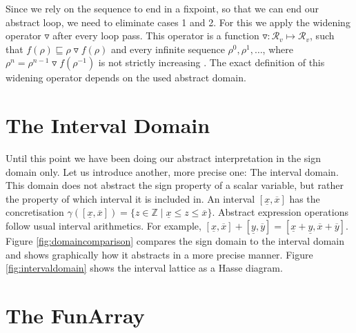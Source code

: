 \begin{enumerate}
\begin{center}
\end{center}
\end{enumerate} 

\noindent Since we rely on the sequence to end in a fixpoint, so that we can end our abstract loop, we need to eliminate cases 1 and 2. For this we apply the widening operator $\triangledown$ after every loop pass. This operator is a function $\triangledown: \mathcal{R}_v\mapsto \mathcal{R}_v$, such that $f(\rho)\sqsubseteq\rho\triangledown f(\rho)$ and every infinite sequence $\rho^0,\rho^1,\dots$, where $\rho^n=\rho^{n-1}\triangledown f(\rho^{-1})$ is not strictly increasing \cite{cousot1977}. The exact definition of this widening operator depends on the used abstract domain.

\section{The Interval Domain}





Until this point we have been doing our abstract interpretation in the sign domain only. Let us introduce another, more precise one: The interval domain. This domain does not abstract the sign property of a scalar variable, but rather the property of which interval it is included in. An interval $[\underline{x},\overline{x}]$ has the concretisation $\gamma([\underline{x},\overline{x}])=\{z\in\mathbb{Z} \;|\; \underline{x}\leq z \leq \overline{x}\}$. Abstract expression operations follow usual interval arithmetics. For example, $[\underline{x},\overline{x}]+[\underline{y},\overline{y}]=[\underline{x}+\underline{y},\overline{x}+\overline{y}]$. Figure \ref{fig:domaincomparison} compares the sign domain to the interval domain and shows graphically how it abstracts in a more precise manner. Figure \ref{fig:intervaldomain} shows the interval lattice as a Hasse diagram.

\clearpage \section{The FunArray}


